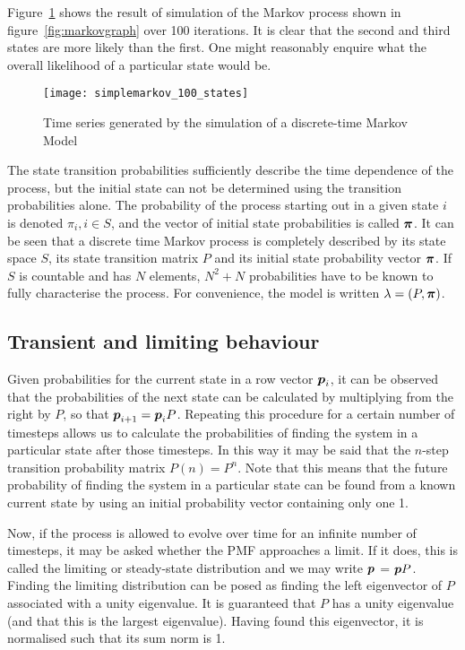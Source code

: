 Figure~\ref{fig:markovtimeseries} shows the result of simulation of the Markov process shown in figure~\ref{fig:markovgraph} over 100 iterations.  
It is clear that the second and third states are more likely than the first.
One might reasonably enquire what the overall likelihood of a particular state would be. 

\begin{figure}[htbp]
  \centering
  \texttt{[image: simplemarkov\_100\_states]}
  \caption{Time series generated by the simulation of a discrete-time Markov Model}
  \label{fig:markovtimeseries}
\end{figure}

The state transition probabilities sufficiently describe the time dependence of the process, but the initial state can not be determined using the transition probabilities alone.
The probability of the process starting out in a given state $i$ is denoted $\pi_i, i \in S$, and the vector of initial state probabilities is called
$\boldsymbol{\pi}$.
It can be seen that a discrete time Markov process is completely described by its state space $S$, its state transition matrix $P$ and its initial state probability vector $\boldsymbol{\pi}$.  
If $S$ is countable and has $N$ elements, $N^2 + N$ probabilities have to be known to fully characterise the process.
For convenience, the model is written $\lambda = (P, \boldsymbol{\pi})$.

\subsection{Transient and limiting behaviour}
Given probabilities for the current state in a row vector $\boldsymbol{p}_i$, it can be observed that the probabilities of the next state can be calculated by multiplying from the right by $P$, so that $\boldsymbol{p}_{i+1} = \boldsymbol{p}_i P$.
Repeating this procedure for a certain number of timesteps allows us to calculate the probabilities of finding the system in a particular state after those timesteps.
In this way it may be said that the $n$-step transition probability matrix $P(n) = P^n$.
Note that this means that the future probability of finding the system in a particular state can be found from a known current state by using an initial probability vector containing only one 1.

Now, if the process is allowed to evolve over time for an infinite number of timesteps, it may be asked whether the PMF approaches a limit.
If it does, this is called the limiting or steady-state distribution and we may write $\boldsymbol{p}$ = $\boldsymbol{p}P$.
Finding the limiting distribution can be posed as finding the left eigenvector of $P$ associated with a unity eigenvalue.
It is guaranteed that $P$ has a unity eigenvalue (and that this is the largest eigenvalue).
Having found this eigenvector, it is normalised such that its sum norm is 1.

